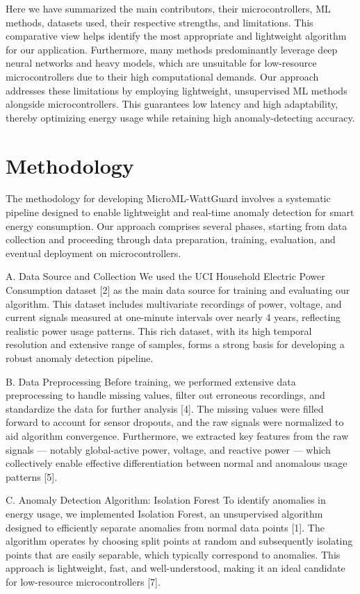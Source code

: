 \documentclass[12pt, draftclsnofoot, onecolumn]{IEEEtran}
\begin{document}
Here we have summarized the main contributors, their microcontrollers, ML methods, datasets used, their respective strengths, and limitations. This comparative view helps identify the most appropriate and lightweight algorithm for our application. Furthermore, many methods predominantly leverage deep neural networks and heavy models, which are unsuitable for low-resource microcontrollers due to their high computational demands. Our approach addresses these limitations by employing lightweight, unsupervised ML methods alongside microcontrollers. This guarantees low latency and high adaptability, thereby optimizing energy usage while retaining high anomaly-detecting accuracy.

\section{Methodology}
The methodology for developing MicroML-WattGuard involves a systematic pipeline designed to enable lightweight and real-time anomaly detection for smart energy consumption. Our approach comprises several phases, starting from data collection and proceeding through data preparation, training, evaluation, and eventual deployment on microcontrollers.

A. Data Source and Collection
We used the UCI Household Electric Power Consumption dataset [2] as the main data source for training and evaluating our algorithm. This dataset includes multivariate recordings of power, voltage, and current signals measured at one-minute intervals over nearly 4 years, reflecting realistic power usage patterns. This rich dataset, with its high temporal resolution and extensive range of samples, forms a strong basis for developing a robust anomaly detection pipeline.

B. Data Preprocessing
Before training, we performed extensive data preprocessing to handle missing values, filter out erroneous recordings, and standardize the data for further analysis [4]. The missing values were filled forward to account for sensor dropouts, and the raw signals were normalized to aid algorithm convergence. Furthermore, we extracted key features from the raw signals — notably global-active power, voltage, and reactive power — which collectively enable effective differentiation between normal and anomalous usage patterns [5].

C. Anomaly Detection Algorithm: Isolation Forest
To identify anomalies in energy usage, we implemented Isolation Forest, an unsupervised algorithm designed to efficiently separate anomalies from normal data points [1]. The algorithm operates by choosing split points at random and subsequently isolating points that are easily separable, which typically correspond to anomalies. This approach is lightweight, fast, and well-understood, making it an ideal candidate for low-resource microcontrollers [7].
\end{document}
